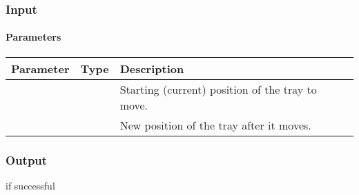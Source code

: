 \documentclass[letterpaper,10pt,english]{sphinxmanual}
\begin{document}
\subsubsection{Input}
\label{\detokenize{docs/Developer/moveTray:input}}
\begin{sphinxVerbatim}[commandchars=\\\{\}]
   
     
     
     
   
     
     
     
\end{sphinxVerbatim}


\paragraph{Parameters}
\label{\detokenize{docs/Developer/moveTray:parameters}}

\begin{savenotes}\sphinxattablestart
\centering
\begin{tabulary}{\linewidth}[t]{|T|T|T|}
\hline
\sphinxstyletheadfamily 
Parameter
&\sphinxstyletheadfamily 
Type
&\sphinxstyletheadfamily 
Description
\\
\hline
{}
&
&
Starting (current) position of the tray to move.
\\
\hline
{}
&
&
New position of the tray after it moves.
\\
\hline
\end{tabulary}
\par
\sphinxattableend\end{savenotes}


\subsubsection{Output}
\label{\detokenize{docs/Developer/moveTray:output}}
 if successful
\end{document}
